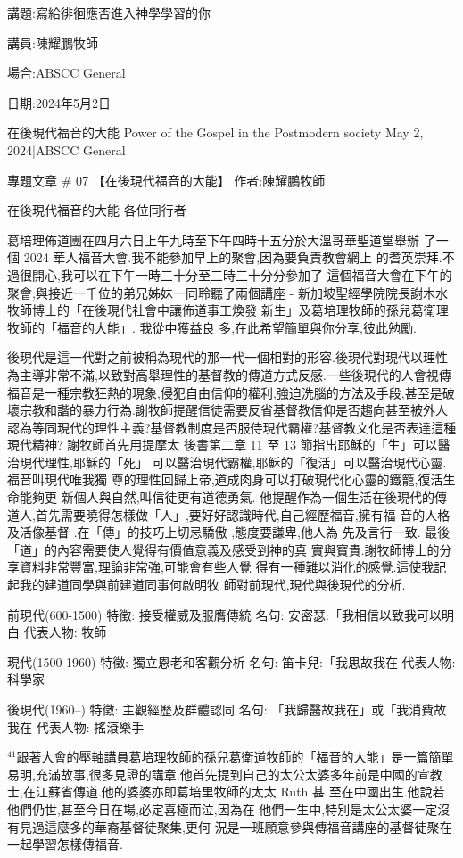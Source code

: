 \documentclass{book}
\begin{document}
講題:寫給徘徊應否進入神學學習的你

講員:陳耀鵬牧師

場合:ABSCC General

日期:2024年5月2日

在後現代福音的大能 Power of the Gospel in the Postmodern society
May 2, 2024|ABSCC General

專題文章 \# 07
【在後現代福音的大能】
作者:陳耀鵬牧師

在後現代福音的大能
各位同行者

葛培理佈道團在四月六日上午九時至下午四時十五分於大溫哥華聖道堂舉辦 了一個 2024 華人福音大會.我不能參加早上的聚會,因為要負責教會網上 的耆英崇拜.不過很開心,我可以在下午一時三十分至三時三十分分參加了 這個福音大會在下午的聚會,與接近一千位的弟兄姊妹一同聆聽了兩個講座
- 新加坡聖經學院院長謝木水牧師博士的「在後現代社會中讓佈道事工煥發 新生」及葛培理牧師的孫兒葛衛理牧師的「福音的大能」. 我從中獲益良 多,在此希望簡單與你分享,彼此勉勵.

後現代是這一代對之前被稱為現代的那一代一個相對的形容.後現代對現代以理性為主導非常不滿,以致對高舉理性的基督教的傳道方式反感.一些後現代的人會視傳福音是一種宗教狂熱的現象,侵犯自由信仰的權利,強迫洗腦的方法及手段,甚至是破壞宗教和諧的暴力行為.謝牧師提醒信徒需要反省基督教信仰是否趨向甚至被外人認為等同現代的理性主義?基督教制度是否服侍現代霸權?基督教文化是否表達這種現代精神? 謝牧師首先用提摩太 後書第二章 11 至 13 節指出耶穌的「生」可以醫治現代理性,耶穌的「死」 可以醫治現代霸權,耶穌的「復活」可以醫治現代心靈.福音叫現代唯我獨 尊的理性回歸上帝,道成肉身可以打破現代化心靈的鐵籠,復活生命能夠更 新個人與自然,叫信徒更有道德勇氣. 他提醒作為一個生活在後現代的傳道人,首先需要曉得怎樣做「人」,要好好認識時代,自己經歷福音,擁有福 音的人格及活像基督 .在「傳」的技巧上切忌驕傲 ,態度要謙卑,他人為 先及言行一致. 最後「道」的內容需要使人覺得有價值意義及感受到神的真 實與寶貴.謝牧師博士的分享資料非常豐富,理論非常強,可能會有些人覺 得有一種難以消化的感覺.這使我記起我的建道同學與前建道同事何啟明牧 師對前現代,現代與後現代的分析.

前現代(600-1500)
特徵: 接受權威及服膺傳統            
名句: 安密瑟:「我相信以致我可以明白 
代表人物: 牧師                          

現代(1500-1960)     
特徵: 獨立恩老和客觀分析  
名句: 笛卡兒:「我思故我在 
代表人物: 科學家              

後現代(1960--)                   
特徵: 主觀經歷及群體認同               
名句: 「我歸醫故我在」或「我消費故我在 
代表人物: 搖滾樂手                         


$^{41}$跟著大會的壓軸講員葛培理牧師的孫兒葛衛道牧師的「福音的大能」是一篇簡單易明,充滿故事,很多見證的講章.他首先提到自己的太公太婆多年前是中國的宣教士,在江蘇省傳道.他的婆婆亦即葛培里牧師的太太 Ruth 甚 至在中國出生.他說若他們仍世,甚至今日在場,必定喜極而泣,因為在 他們一生中,特別是太公太婆一定沒有見過這麼多的華裔基督徒聚集,更何 況是一班願意參與傳福音講座的基督徒聚在一起學習怎樣傳福音.
\end{document}
